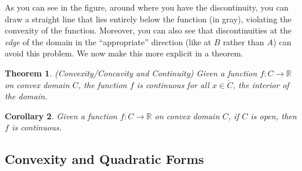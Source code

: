 \documentclass[12pt]{article}
\numberwithin{equation}{section} %
\theoremstyle{plain}
\newtheorem{thm}{Theorem}[section]
\newtheorem{cor}[thm]{Corollary}
\theoremstyle{definition}
\theoremstyle{remark}
\newcommand{\R}{\mathbb{R}}
\begin{document}
As you can see in the figure, around where you have the discontinuity,
you can draw a straight line that lies entirely below the function (in
gray), violating the convexity of the function. Moreover, you can also
see that discontinuities at the \emph{edge} of the domain in the
``appropriate'' direction (like at $B$ rather than $A$) can avoid this
problem. We now make this more explicit in a theorem.

\begin{thm}{\emph{(Convexity/Concavity and Continuity)}}
Given a function $f:C\rightarrow\R$ on convex domain $C$, the function
$f$ is continuous for all $x \in \mathring{C}$, the interior of the
domain.
\end{thm}

\begin{cor}
Given a function $f:C\rightarrow\R$ on convex domain $C$, if $C$ is
open, then $f$ is continuous.
\end{cor}

\subsection{Convexity and Quadratic Forms}
\end{document}
